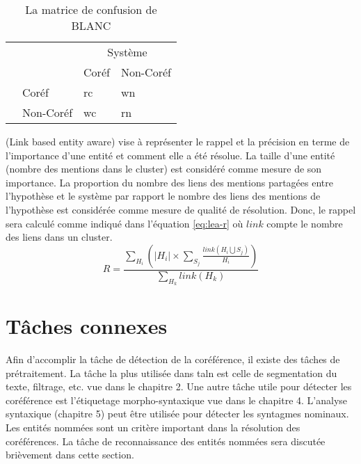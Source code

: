 \documentclass{KodeBook}
\begin{document}
\begin{table}[ht]
	\centering 
	\begin{tabular}{llll}
		\cline{3-4}\noalign{\vskip\doublerulesep
			\vskip-\arrayrulewidth}\cline{3-4}
		&& \multicolumn{2}{c}{Système} \\
		\cline{3-4}
	    && Coréf & Non-Coréf  \\
	    \cline{1-2}\noalign{\vskip\doublerulesep
	    	\vskip-\arrayrulewidth}\hline
	    
	\multirow{2}{*}{Hypothèse} & Coréf & rc & wn \\
	                       & Non-Coréf & wc & rn \\
	   \hline\hline
	\end{tabular}
	\caption{La matrice de confusion de BLANC \cite{2011-recasens-hovy}}
	\label{tab:blanc-confusion}
\end{table}

 (Link based entity aware) vise à représenter le rappel et la précision en terme de l'importance d'une entité et comment elle a été résolue. 
La taille d'une entité (nombre des mentions dans le cluster) est considéré comme mesure de son importance. 
La proportion du nombre des liens des mentions partagées entre l'hypothèse et le système par rapport le nombre des liens des mentions de l'hypothèse est considérée comme mesure de qualité de résolution. 
Donc, le rappel sera calculé comme indiqué dans l'équation \ref{eq:lea-r} où $link$ compte le nombre des liens dans un cluster.
\begin{equation}\label{eq:lea-r}
R = \frac{\sum_{H_i} (|H_i| \times \sum_{S_j} \frac{link(H_i \bigcup S_j)}{H_i})}{\sum_{H_k} link(H_k)}
\end{equation}

\section{Tâches connexes}

Afin d'accomplir la tâche de détection de la coréférence, il existe des tâches de prétraitement. 
La tâche la plus utilisée dans \ac{taln} est celle de segmentation du texte, filtrage, etc. vue dans le chapitre 2. 
Une autre tâche utile pour détecter les coréférence est l'étiquetage morpho-syntaxique vue dans le chapitre 4.
L'analyse syntaxique (chapitre 5) peut être utilisée pour détecter les syntagmes nominaux. 
Les entités nommées sont un critère important dans la résolution des coréférences.
La tâche de reconnaissance des entités nommées sera discutée brièvement dans cette section.
\end{document}
